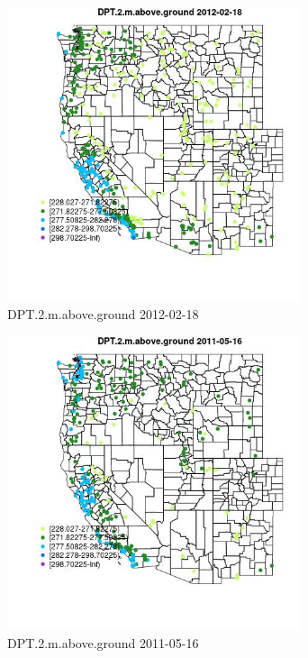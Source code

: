 \begin{figure} 
\centering  
\includegraphics[width=0.77\textwidth]{Code_Outputs/Report_ML_input_PM25_Step4_part_f_de_duplicated_aves_prioritize_24hr_obswNAs_MapObsDPT2maboveground2012-02-18.jpg} 
\caption{\label{fig:Report_ML_input_PM25_Step4_part_f_de_duplicated_aves_prioritize_24hr_obswNAsMapObsDPT2maboveground2012-02-18}DPT.2.m.above.ground 2012-02-18} 
\end{figure} 
 

\begin{figure} 
\centering  
\includegraphics[width=0.77\textwidth]{Code_Outputs/Report_ML_input_PM25_Step4_part_f_de_duplicated_aves_prioritize_24hr_obswNAs_MapObsDPT2maboveground2011-05-16.jpg} 
\caption{\label{fig:Report_ML_input_PM25_Step4_part_f_de_duplicated_aves_prioritize_24hr_obswNAsMapObsDPT2maboveground2011-05-16}DPT.2.m.above.ground 2011-05-16} 
\end{figure} 
 

